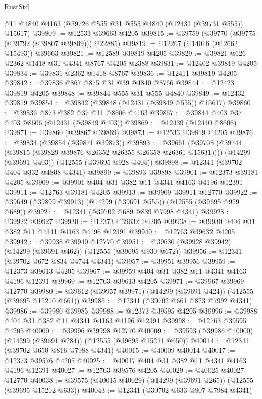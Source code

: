 \begin{lexlean}{RustStd}
\begin{coremodule}
    @11
    @4840
    @4163
    (@39726 @555 @31 @555 @4840 (@12431 (@39731 @555)) @15617)
@39809 := @12533 @39663 @4205
@39815 := @39759 (@39770 (@39775 (@39792 (@39807 @39809))) @22885)
@39819 := @12267 (@14016 (@12662 @15493)) @39663
@39821 := @12589 @39819 @4205
@39829 := @39821 @626 @2362 @1418 @31 @4341 @8767 @4205 @2388
@39831 := @12402 @39819 @4205
@39834 := @39831 @2362 @1418 @8767
@39836 := @12411 @39819 @4205
@39842 := @39836 @867 @875 @31 @39 @4840 @8766
@39844 := @12423 @39819 @4205
@39848 := @39844 @555 @31 @555 @4840
@39849 := @12432 @39819
@39854 := @39842 (@39848 (@12431 (@39849 @555)) @15617)
@39860 := @39836 @873 @382 @37 @11 @8606 @4163
@39867 := @39844 @403 @37 @403 @8606 (@12431 (@39849 @403))
@39869 := @12439 (@12440 @8606)
@39871 := @39860 (@39867 @39869)
@39873 := @12533 @39819 @4205
@39876 := @39834 (@39854 (@39871 @39873))
@39893 := @39661
    (@39708 (@39744 (@39815 (@39829 @39876 @26352 @26355 @26358 @26361 @15631))))
    (@14299 (@39691 @403))
    (@12555 (@39695 @928 @404))
@39898 := @12341 (@39702 @404 @332 @4808 @4341)
@39899 := @39893 @39898
@39901 := @12373 @39181 @4205
@39909 := @39901 @404 @31 @382 @11 @4341 @4163 @4196 @12391
@39911 := @12763 @39181 @4205
@39913 := @39909 @39911 @12770
@39922 := @39649 (@39899 @39913) (@14299 (@39691 @555)) (@12555 (@39695 @929 @689))
@39927 := @12341 (@39702 @689 @839 @7998 @4341)
@39928 := @39922 @39927
@39930 := @12373 @39632 @4205
@39938 := @39930 @404 @31 @382 @11 @4341 @4163 @4196 @12391
@39940 := @12763 @39632 @4205
@39942 := @39938 @39940 @12770
@39951 := @39630 (@39928 @39942) (@14299 (@39691 @462)) (@12555 (@39695 @930 @672))
@39956 := @12341 (@39702 @672 @834 @4744 @4341)
@39957 := @39951 @39956
@39959 := @12373 @39613 @4205
@39967 := @39959 @404 @31 @382 @11 @4341 @4163 @4196 @12391
@39969 := @12763 @39613 @4205
@39971 := @39967 @39969 @12770
@39980 := @39612 (@39957 @39971) (@14299 (@39691 @424)) (@12555 (@39695 @15210 @661))
@39985 := @12341 (@39702 @661 @823 @7992 @4341)
@39986 := @39980 @39985
@39988 := @12373 @39595 @4205
@39996 := @39988 @404 @31 @382 @11 @4341 @4163 @4196 @12391
@39998 := @12763 @39595 @4205
@40000 := @39996 @39998 @12770
@40009 := @39593 (@39986 @40000) (@14299 (@39691 @284)) (@12555 (@39695 @15211 @650))
@40014 := @12341 (@39702 @650 @816 @7988 @4341)
@40015 := @40009 @40014
@40017 := @12373 @39576 @4205
@40025 := @40017 @404 @31 @382 @11 @4341 @4163 @4196 @12391
@40027 := @12763 @39576 @4205
@40029 := @40025 @40027 @12770
@40038 := @39575 (@40015 @40029) (@14299 (@39691 @265)) (@12555 (@39695 @15212 @633))
@40043 := @12341 (@39702 @633 @807 @7984 @4341)

\end{coremodule}
\end{lexlean}
